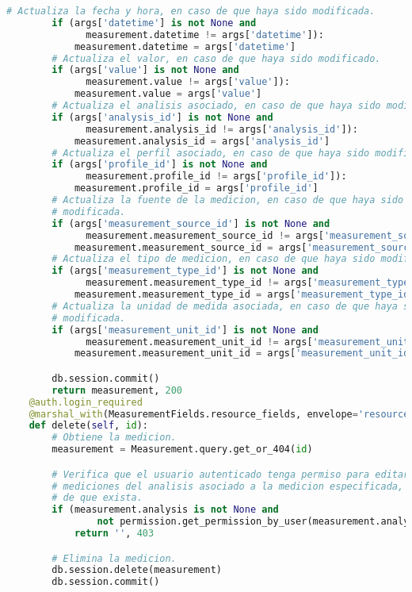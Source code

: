 \begin{enumerate}
\begin{lstlisting}[language=Python]
        # Actualiza la fecha y hora, en caso de que haya sido modificada.
        if (args['datetime'] is not None and
              measurement.datetime != args['datetime']):
            measurement.datetime = args['datetime']
        # Actualiza el valor, en caso de que haya sido modificado.
        if (args['value'] is not None and
              measurement.value != args['value']):
            measurement.value = args['value']
        # Actualiza el analisis asociado, en caso de que haya sido modificado.
        if (args['analysis_id'] is not None and
              measurement.analysis_id != args['analysis_id']):
            measurement.analysis_id = args['analysis_id']
        # Actualiza el perfil asociado, en caso de que haya sido modificado.
        if (args['profile_id'] is not None and
              measurement.profile_id != args['profile_id']):
            measurement.profile_id = args['profile_id']
        # Actualiza la fuente de la medicion, en caso de que haya sido
        # modificada.
        if (args['measurement_source_id'] is not None and
              measurement.measurement_source_id != args['measurement_source_id']):
            measurement.measurement_source_id = args['measurement_source_id']
        # Actualiza el tipo de medicion, en caso de que haya sido modificado.
        if (args['measurement_type_id'] is not None and
              measurement.measurement_type_id != args['measurement_type_id']):
            measurement.measurement_type_id = args['measurement_type_id']
        # Actualiza la unidad de medida asociada, en caso de que haya sido
        # modificada.
        if (args['measurement_unit_id'] is not None and
              measurement.measurement_unit_id != args['measurement_unit_id']):
            measurement.measurement_unit_id = args['measurement_unit_id']

        db.session.commit()
        return measurement, 200
    @auth.login_required
    @marshal_with(MeasurementFields.resource_fields, envelope='resource')
    def delete(self, id):
        # Obtiene la medicion.
        measurement = Measurement.query.get_or_404(id)

        # Verifica que el usuario autenticado tenga permiso para editar las
        # mediciones del analisis asociado a la medicion especificada, en caso
        # de que exista.
        if (measurement.analysis is not None and
                not permission.get_permission_by_user(measurement.analysis, g.user, 'edit_measurements')):
            return '', 403

        # Elimina la medicion.
        db.session.delete(measurement)
        db.session.commit()


\end{lstlisting}
\end{enumerate}
